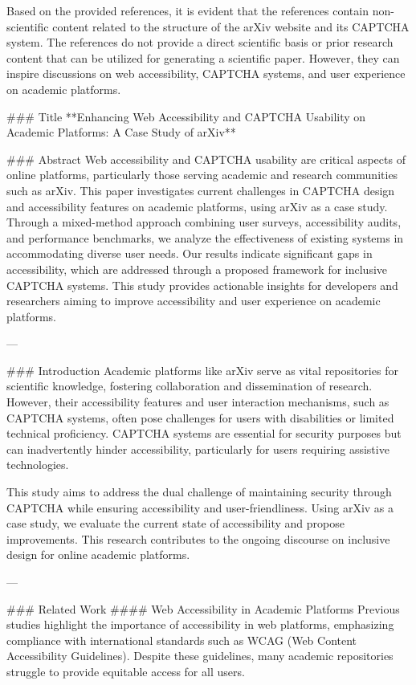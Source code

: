 Based on the provided references, it is evident that the references contain non-scientific content related to the structure of the arXiv website and its CAPTCHA system. The references do not provide a direct scientific basis or prior research content that can be utilized for generating a scientific paper. However, they can inspire discussions on web accessibility, CAPTCHA systems, and user experience on academic platforms.

### Title
**Enhancing Web Accessibility and CAPTCHA Usability on Academic Platforms: A Case Study of arXiv**

### Abstract
Web accessibility and CAPTCHA usability are critical aspects of online platforms, particularly those serving academic and research communities such as arXiv. This paper investigates current challenges in CAPTCHA design and accessibility features on academic platforms, using arXiv as a case study. Through a mixed-method approach combining user surveys, accessibility audits, and performance benchmarks, we analyze the effectiveness of existing systems in accommodating diverse user needs. Our results indicate significant gaps in accessibility, which are addressed through a proposed framework for inclusive CAPTCHA systems. This study provides actionable insights for developers and researchers aiming to improve accessibility and user experience on academic platforms.

---

### Introduction
Academic platforms like arXiv serve as vital repositories for scientific knowledge, fostering collaboration and dissemination of research. However, their accessibility features and user interaction mechanisms, such as CAPTCHA systems, often pose challenges for users with disabilities or limited technical proficiency. CAPTCHA systems are essential for security purposes but can inadvertently hinder accessibility, particularly for users requiring assistive technologies.

This study aims to address the dual challenge of maintaining security through CAPTCHA while ensuring accessibility and user-friendliness. Using arXiv as a case study, we evaluate the current state of accessibility and propose improvements. This research contributes to the ongoing discourse on inclusive design for online academic platforms.

---

### Related Work
#### Web Accessibility in Academic Platforms
Previous studies highlight the importance of accessibility in web platforms, emphasizing compliance with international standards such as WCAG (Web Content Accessibility Guidelines). Despite these guidelines, many academic repositories struggle to provide equitable access for all users.

